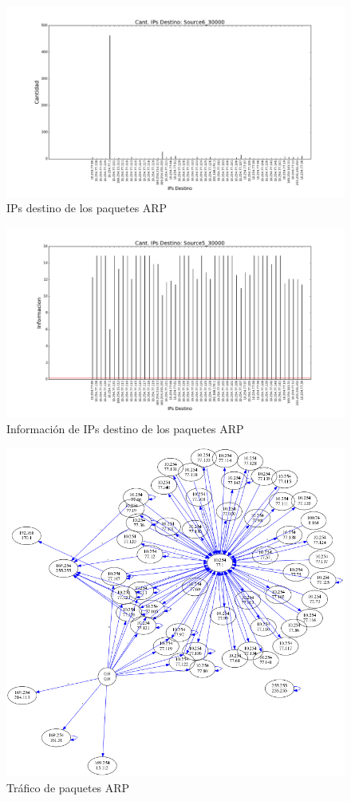 \begin{figure}[H]
       \centering
       \includegraphics[width=1\textwidth]{../resultados/Starbucks/histogram_dst.png}
       \caption{IPs destino de los paquetes ARP}
       \label{red-Starbucks-dst}
\end{figure}


\begin{figure}[H]
       \centering
       \includegraphics[width=1\textwidth]{../resultados/Starbucks/histogram_dst_information.png}
       \caption{Información de IPs destino de los paquetes ARP}
       \label{red-Starbucks-dst-information}
\end{figure}


\begin{figure}[H]
       \centering
       \includegraphics[width=1\textwidth]{../resultados/Starbucks/network.png}
       \caption{Tráfico de paquetes ARP}
       \label{red-Starbucks-dst-information}
\end{figure}


